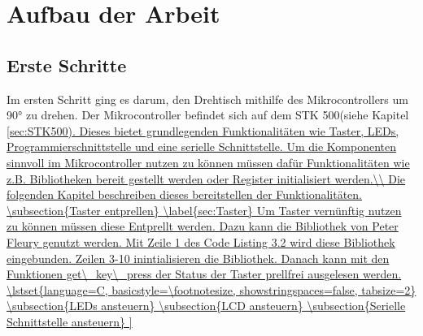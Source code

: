 \chapter{Aufbau der Arbeit}
\label{sec:AufbauDerArbeit}

\section{Erste Schritte}
Im ersten Schritt ging es darum, den Drehtisch mithilfe des Mikrocontrollers um 90° zu drehen. Der Mikrocontroller befindet sich auf dem STK 500(siehe Kapitel \ref{sec:STK500). Dieses bietet grundlegenden Funktionalitäten wie Taster, LEDs, Programmierschnittstelle und eine serielle Schnittstelle.
Um die Komponenten sinnvoll im Mikrocontroller nutzen zu können müssen dafür Funktionalitäten wie z.B. Bibliotheken bereit gestellt werden oder Register initialisiert werden.\\
Die folgenden Kapitel beschreiben dieses bereitstellen der Funktionalitäten.
\subsection{Taster entprellen}
\label{sec:Taster}
Um Taster vernünftig nutzen zu können müssen diese Entprellt werden. Dazu kann die Bibliothek von Peter Fleury genutzt werden. Mit Zeile 1 des Code Listing 3.2 wird diese Bibliothek eingebunden. Zeilen 3-10 inintialisieren die Bibliothek.
Danach kann mit den Funktionen get\_key\_press der Status der Taster prellfrei ausgelesen werden.
\lstset{language=C, basicstyle=\footnotesize, showstringspaces=false, tabsize=2}


\subsection{LEDs ansteuern}
\subsection{LCD ansteuern}
\subsection{Serielle Schnittstelle ansteuern}	


}
